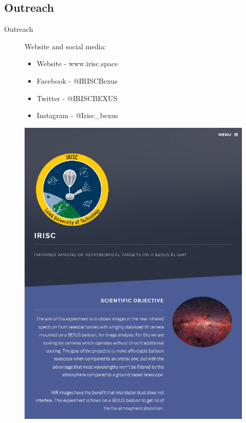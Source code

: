 \documentclass[11pt, aspectratio=169]{beamer}
\begin{document}
\subsection{Outreach} 			%
{\nologo
\begin{frame}{Outreach}
\begin{figure}[!htb]
	\centering
    \begin{minipage}{0.5\textwidth}
    \vspace{-2cm}
    Website and social media:
    	\begin{itemize}
    		\item Website - www.irisc.space
    		\item Facebook - @IRISCBexus
    		\item Twitter - @IRISCBEXUS
    		\item Instagram - @Irisc\_bexus
    	\end{itemize}
    \end{minipage}%
    \begin{minipage}{.5\textwidth}
        \centering
        \includegraphics[width=0.9\linewidth]{figures/images/website.png}
    \end{minipage}%
\end{figure}
\end{frame}
}
\end{document}
